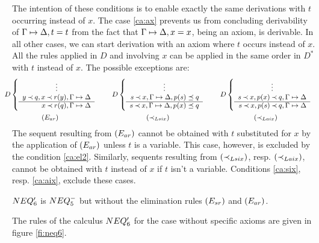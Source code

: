 \begin{PROOF}
The intention of these conditions is to enable exactly the same derivations
with $t$ occurring instead of $x$.
The case \ref{ca:ax} prevents us from concluding derivability of $\Gamma\mathrel{\mapsto}\Delta, t=t$
from the fact that $\Gamma\mathrel{\mapsto}\Delta,x=x$, being an axiom, is derivable. 
In all other cases, we can
 start derivation with an axiom where $t$ occurs instead of $x$. All the
 rules applied in $D$ and involving $x$ can be applied 
in the same order in $D^*$ with $t$ instead of $x$.
The possible exceptions  are: %
\[ \sma{ \begin{array}{c@{\ \ \ \ \ \ \ }c@{\ \ \ \ \ \ \ }c}
D \left \{ \begin{array}{rl}
 \multicolumn{1}{c}{\vdots} \\
 y\Incl q, x\Incl r(y),\GSD  \\ \cline{1-1}
 x\Incl r(q),\GSD  %
 \end{array} \right . 
&
D \left \{ \begin{array}{rl}
 \multicolumn{1}{c}{\vdots} \\
 s\Incl x,\GSD, p(s)\preceq q  \\ \cline{1-1}
 s\Incl x,\GSD, p(x)\preceq q  %
 \end{array} \right . 
&
D \left \{ \begin{array}{rl}
 \multicolumn{1}{c}{\vdots} \\
 s\Incl x, p(x)\Incl q,\GSD  \\ \cline{1-1}
 s\Incl x, p(s)\Incl q, \GSD  %
\end{array} \right . \\[5ex]
 \Ear &  \Lsix &  \Laix
\end{array} }
\]
The sequent resulting from $(E_{ar})$ cannot be obtained with $t$ substituted for $x$ by the
application of $(E_{ar})$ unless $t$ is a variable. This case, however, is
excluded by the condition \ref{ca:el2}.
Similarly, sequents resulting from $(\mathbin{\prec}_{Lsix})$, resp. $(\mathbin{\prec}_{Laix})$, cannot be obtained with
$t$ instead of $x$ 
if $t$ isn't a variable. Conditions \ref{ca:six}, resp. \ref{ca:aix}, 
exclude these cases.
\end{PROOF}

\begin{DEFINITION}\label{de:neq6}
 $NEQ_6'$ is $NEQ_5^-$ but without the elimination rules $(E_{sr})$
 and $(E_{ar})$. %
\end{DEFINITION}
\noindent
The rules of the calculus  $NEQ_6'$ for the case without specific axioms 
are given in figure \ref{fi:neq6}. 


